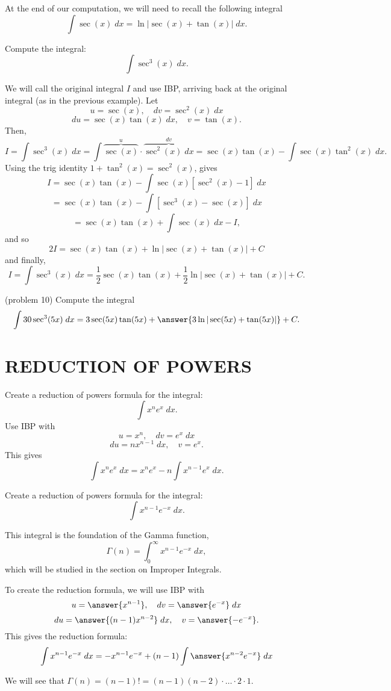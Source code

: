 \documentclass{ximera}
\begin{document}
At the end of our computation, we will need to recall the following integral
\[
\int \sec(x) \; dx = \ln|\sec(x) + \tan(x)| \; dx.
\]

\begin{example}[example 10]
Compute the integral:
\[
\int \sec^3(x) \; dx.
\]

We will call the original integral $I$ and use IBP, arriving back at the original integral (as in the previous example).
Let
\[
u = \sec(x), \quad dv = \sec^2(x) \; dx
\]
\[
du = \sec(x)\tan(x) \; dx, \quad v = \tan(x).
\]
Then,
\[
I = \int \sec^3(x) \; dx = \int \overbrace{\sec(x)}^u \cdot \overbrace{\sec^2(x) \; dx}^{dv} = \sec(x) \tan(x) - \int \sec(x) \tan^2(x) \; dx.
\]
Using the trig identity $1 + \tan^2(x) = \sec^2(x)$, gives
\[
I = \sec(x) \tan(x) - \int \sec(x) [\sec^2(x) -1] \; dx
\]
\[
=\sec(x) \tan(x) - \int  [\sec^3(x) -\sec(x)] \; dx 
\]
\[
= \sec(x) \tan(x) + \int \sec(x)\; dx -I,
\]
and so
\[
2I = \sec(x) \tan(x) + \ln|\sec(x) + \tan(x)| + C
\]
and finally,
\[
I = \int \sec^3(x) \; dx = \frac12 \sec(x) \tan(x) + \frac12 \ln|\sec(x) + \tan(x)| + C.
\]
\end{example}

\begin{problem}(problem 10)
Compute the integral
\[
\int 30\sec^3(5x) \; dx = 3\sec(5x) \tan(5x) +  \answer{3\ln|\sec(5x) + \tan(5x)|} + C.
\]
\end{problem}


\section{REDUCTION OF POWERS}


\begin{example}
Create a reduction of powers formula for the integral:
\[
\int x^n e^x \; dx.
\]
Use IBP with
\[
u = x^n, \quad dv = e^x \; dx
\]
\[
du = nx^{n-1}\; dx,  \quad v = e^x.
\]
This gives
\[
\int x^n e^x \; dx = x^n e^x - n\int x^{n-1} e^x \; dx.
\]
\end{example}

\begin{problem}
Create a reduction of powers formula for the integral:
\[
\int x^{n-1}e^{-x} \; dx.
\]
\begin{remark}
This integral is the foundation of the Gamma function,
\[
\Gamma(n) = \int_0^\infty x^{n-1}e^{-x} \; dx,
\]
which will be studied in the section on Improper Integrals.
\end{remark}
To create the reduction formula, we will use IBP with
\[
u = \answer{x^{n-1}}, \quad dv = \answer{e^{-x}} \; dx
\]
\[
du = \answer{(n-1)x^{n-2}}\; dx,  \quad v = \answer{-e^{-x}}.
\]
This gives the reduction formula:
\[
\int x^{n-1}e^{-x} \; dx = -x^{n-1}e^{-x} + (n-1)\int \answer{x^{n-2}e^{-x}} \; dx
\]
\begin{remark}
We will see that $\Gamma(n) = (n-1)! = (n-1)(n-2)\cdot \ldots \cdot 2 \cdot 1$.
\end{remark}

\end{problem}
\end{document}
